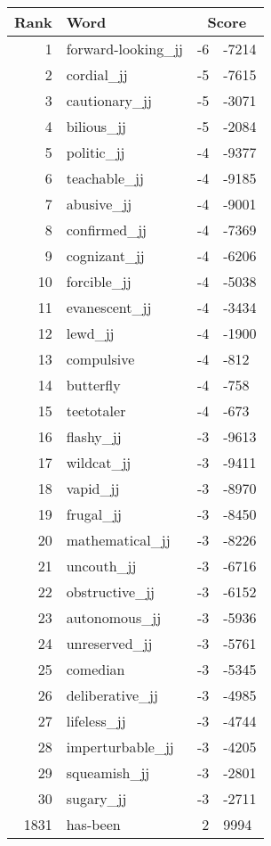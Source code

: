 \begin{longtable}[!htbp]{| rlr@{.}l |}
    \hline
    \textbf{Rank} & \textbf{Word} & \multicolumn{2}{c|}{\textbf{Score}} \\
    \hline
    \endhead
    1 & forward-looking\_jj & -6 & -7214 \\
    2 & cordial\_jj & -5 & -7615 \\
    3 & cautionary\_jj & -5 & -3071 \\
    4 & bilious\_jj & -5 & -2084 \\
    5 & politic\_jj & -4 & -9377 \\
    6 & teachable\_jj & -4 & -9185 \\
    7 & abusive\_jj & -4 & -9001 \\
    8 & confirmed\_jj & -4 & -7369 \\
    9 & cognizant\_jj & -4 & -6206 \\
    10 & forcible\_jj & -4 & -5038 \\
    11 & evanescent\_jj & -4 & -3434 \\
    12 & lewd\_jj & -4 & -1900 \\
    13 & compulsive & -4 & -812 \\
    14 & butterfly & -4 & -758 \\
    15 & teetotaler & -4 & -673 \\
    16 & flashy\_jj & -3 & -9613 \\
    17 & wildcat\_jj & -3 & -9411 \\
    18 & vapid\_jj & -3 & -8970 \\
    19 & frugal\_jj & -3 & -8450 \\
    20 & mathematical\_jj & -3 & -8226 \\
    21 & uncouth\_jj & -3 & -6716 \\
    22 & obstructive\_jj & -3 & -6152 \\
    23 & autonomous\_jj & -3 & -5936 \\
    24 & unreserved\_jj & -3 & -5761 \\
    25 & comedian & -3 & -5345 \\
    26 & deliberative\_jj & -3 & -4985 \\
    27 & lifeless\_jj & -3 & -4744 \\
    28 & imperturbable\_jj & -3 & -4205 \\
    29 & squeamish\_jj & -3 & -2801 \\
    30 & sugary\_jj & -3 & -2711 \\
    1831 & has-been & 2 & 9994 \\

\end{longtable}
